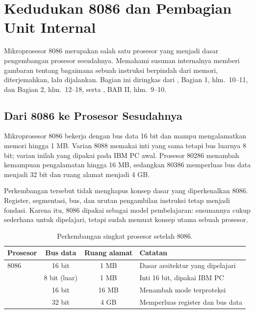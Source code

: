 \section{Kedudukan 8086 dan Pembagian Unit Internal}
\label{sec:kedudukan-8086}

Mikroprosesor 8086 merupakan salah satu prosesor yang menjadi dasar
pengembangan prosesor sesudahnya. Memahami susunan internalnya
memberi gambaran tentang bagaimana sebuah instruksi berpindah dari
memori, diterjemahkan, lalu dijalankan. Bagian ini diringkas dari
\cite{gunawan2019}, Bagian 1, hlm.~10--11, dan Bagian 2,
hlm.~12--18, serta \cite{sto2001}, BAB II, hlm.~9--10.

\subsection{Dari 8086 ke Prosesor Sesudahnya}

Mikroprosesor 8086 bekerja dengan bus data 16 bit dan mampu
mengalamatkan memori hingga 1 MB. Varian 8088 memakai inti yang sama
tetapi bus luarnya 8 bit; varian inilah yang dipakai pada IBM PC
awal. Prosesor 80286 menambah kemampuan pengalamatan hingga 16 MB,
sedangkan 80386 memperluas bus data menjadi 32 bit dan ruang alamat
menjadi 4 GB.

Perkembangan tersebut tidak menghapus konsep dasar yang diperkenalkan
8086. Register, segmentasi, bus, dan urutan pengambilan instruksi
tetap menjadi fondasi. Karena itu, 8086 dipakai sebagai model
pembelajaran: susunannya cukup sederhana untuk dipelajari, tetapi
sudah memuat konsep utama sebuah prosesor.

\begin{table}[H]
    \centering
    \caption{Perkembangan singkat prosesor setelah 8086.}
    \label{tab:generasi-8086}
    \small
    \begin{tabular}{@{}lccp{6.0cm}@{}}
        \toprule
        \textbf{Prosesor} & \textbf{Bus data} &
        \textbf{Ruang alamat} & \textbf{Catatan} \\
        \midrule
        8086 & 16 bit & 1 MB & Dasar arsitektur yang dipelajari \\
        \addlinespace
        8088 & 8 bit (luar) & 1 MB & Inti 16 bit, dipakai IBM PC \\
        \addlinespace
        80286 & 16 bit & 16 MB & Menambah mode terproteksi \\
        \addlinespace
        80386 & 32 bit & 4 GB & Memperluas register dan bus data \\
        \bottomrule
    \end{tabular}
\end{table}

